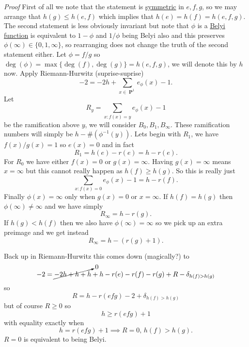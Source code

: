 \documentclass[10pt,]{book}
\makeatletter
\renewcommand*{\proofname}{Proof}
\renewenvironment{proof}[1][\proofname]{\par
  \pushQED{\qed}%
  \normalfont \topsep6\p@\@plus6\p@\relax
  \trivlist
  \item\relax
    {\itshape
    #1\@addpunct{.}}\hspace\labelsep\ignorespaces
}{%
  \popQED\endtrivlist\@endpefalse
}
\numberwithin{equation}{section}
\newcommand{\inv}{^{-1}}
\DeclareMathOperator{\PP}{\mathbf{P}}
\newcommand{\lt}{<}
\newcommand{\gt}{>}
\makeatother
\begin{document}
\begin{proof}\hypertarget{proof-100}{}
\hypertarget{p-703}{}%
First of all we note that the statement is \hyperref[def-princ-pol]{symmetric} in \(e,f,g\), so we may arrange that \(h(g) \le h(e,f)\) which implies that \(h(e) = h(f) = h(e,f,g)\). The second statement is less obviously invariant but note that \(\phi\) is  a \hyperref[def-belyi-function]{Belyi function} is equivalent to \(1-\phi\) and \(1/\phi\) being Belyi also and this preserves \(\phi(\infty) \in \{0,1,\infty\}\), so rearranging does not change the truth of the second statement either. Let \(\phi = f/g\) so \(\deg(\phi) = \max\{\deg (f), \deg(g)\} = h(e,f,g)\), we will denote this by \(h\) now. Apply Riemann-Hurwitz (suprise-suprise)%
\begin{equation*}
-2 = -2h + \sum_{x\in \PP^1} e_\phi(x) - 1\text{.}
\end{equation*}
Let%
\begin{equation*}
R_y = \sum_{x : f(x) = y} e_\phi(x) - 1
\end{equation*}
be the ramification above \(y\), we will consider \(B_0, B_1, B_\infty\). These ramification numbers will simply be \(h - \#(\phi\inv(y))\). Lets begin with \(R_1\), we have \(f(x)/g(x) = 1\) so \(e(x) = 0\) and in fact%
\begin{equation*}
R_1 = h(e) - r(e) = h - r(e)\text{.}
\end{equation*}
For \(R_0\) we have either \(f(x) = 0\) or \(g(x) = \infty\). Having \(g(x) = \infty\) means \(x = \infty\) but this cannot really happen as \(h(f) \ge h(g)\). So this is really just%
\begin{equation*}
\sum_{x : f(x) = 0} e_\phi(x) - 1 = h  - r(f)\text{.}
\end{equation*}
Finally \(\phi(x) = \infty\) only when \(g(x) = 0\) or \(x = \infty\). If \(h(f) = h(g)\) then \(\phi(\infty) \ne \infty\) and we have simply%
\begin{equation*}
R_\infty = h - r(g)\text{.}
\end{equation*}
If \(h(g) \lt h(f)\) then we also have \(\phi(\infty) = \infty\) so we pick up an extra preimage and we get instead%
\begin{equation*}
R_\infty = h - (r(g) + 1)\text{.}
\end{equation*}
%
\par
\hypertarget{p-704}{}%
Back up in Riemann-Hurwitz this comes down (magically?) to%
\begin{equation*}
-2 = \cancelto{0}{-2 h + h + h} + h - r(e) -r(f) - r(g) + R - \delta_{h(f) \gt h(g)}
\end{equation*}
so%
\begin{equation*}
R = h - r(efg) - 2 + \delta_{h(f) \gt h(g)}
\end{equation*}
but of course \(R \ge 0\) so%
\begin{equation*}
h \ge r(efg) + 1
\end{equation*}
with equality exactly when%
\begin{equation*}
h = r(efg) + 1 \implies R = 0,\, h(f) \gt h(g)\text{.}
\end{equation*}
\(R= 0\) is equivalent to being Belyi.%
\end{proof}
\end{document}
